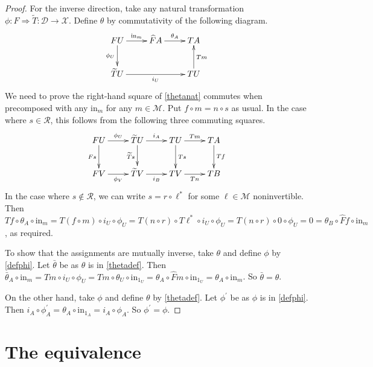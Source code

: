 \documentclass[a4paper,12pt,reqno]{amsart}
\theoremstyle{definition}
\theoremstyle{fact}
\theoremstyle{genquest}
\theoremstyle{step}
\newcommand{\ra}{\rightarrow}
\def\CD{{\mathscr D}}
\def\CM{{\mathscr M}}
\def\CR{{\mathscr R}}
\def\CX{{\mathscr X}}
\begin{document}
\begin{proof}
For the inverse direction, take any natural transformation $\phi : F\Rightarrow \widetilde{T} : \CD\ra \CX$.
Define $\theta$ by commutativity of the following diagram.
\begin{equation}\label{thetadef}
\begin{aligned}
\xymatrix{
FU \ar[r]^-{\mathrm{in}_m} \ar[d]_-{\phi_U} & \widehat{F}A  \ar[r]^-{\theta_A} & TA \\
\widetilde{T}U \ar[rr]_-{i_U} &  & TU \ar[u]_-{Tm}}
\end{aligned}
\end{equation}       
We need to prove the right-hand square of \eqref{thetanat} commutes when precomposed
with any $\mathrm{in}_m$ for any $m \in \CM$. Put $f\circ m = n\circ s$ as usual. In the case
where $s\in \CR$, this follows from the following three commuting squares.
\begin{equation}\label{pfthetanat}
\begin{aligned}
\xymatrix{
FU \ar[r]^-{\phi_U} \ar[d]_-{Fs} & \widetilde{T}U \ar[d]_-{\widetilde{T}s} \ar[r]^-{i_A} & TU \ar[r]^-{Tm} \ar[d]^-{Ts} & TA \ar[d]^-{Tf}\\
FV \ar[r]_-{\phi_V} & \widetilde{T}V  \ar[r]_-{i_B} & TV \ar[r]_-{Tn} & TB}
\end{aligned}
\end{equation}
In the case where $s\notin \CR$, we can write $s = r\circ \ell^*$ for some $\ell \in \CM$ noninvertible.
Then $Tf \circ \theta_A \circ \mathrm{in}_m = T(f\circ m)\circ i_U \circ \phi_U =T(n\circ r) \circ T\ell^*\circ i_U \circ \phi_U = T(n\circ r) \circ 0 \circ \phi_U = 0 = \theta_B \circ \widehat{F}f \circ \mathrm{in}_m$, as required.

To show that the assignments are mutually inverse, take $\theta$ and define $\phi$ by \eqref{defphi}. 
Let $\bar{\theta}$ be as $\theta$ is in \eqref{thetadef}. Then $\bar{\theta}_A\circ \mathrm{in}_m = Tm \circ i_U\circ \phi_U = Tm \circ \theta_U \circ \mathrm{in}_{1_U} = \theta_A \circ \widehat{F}m\circ \mathrm{in}_{1_U} = \theta_A \circ \mathrm{in}_m$. So $\bar{\theta} = \theta$. 

On the other hand, take $\phi$ and define $\theta$ by \eqref{thetadef}. 
Let $\phi^{\prime}$ be as $\phi$ is in \eqref{defphi}. 
Then $i_A \circ \phi^{\prime}_A = \theta_A \circ \mathrm{in}_{1_A} = i_A\circ \phi_A$. 
So $\phi^{\prime} = \phi$.     
\end{proof}

\section{The equivalence}
\end{document}
